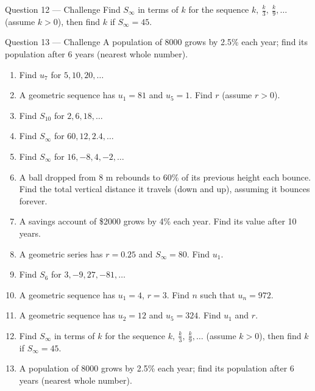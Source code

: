 \documentclass[11pt]{article}
\begin{document}
\begin{qbox}{Question 12 --- Challenge}
Find $S_\infty$ in terms of $k$ for the sequence $k,\ \tfrac k3,\ \tfrac{k}{9},\dots$ (assume $k>0$), then find $k$ if $S_\infty=45$.\workspace{3.4cm}
\end{qbox}

\begin{qbox}{Question 13 --- Challenge}
A population of 8000 grows by 2.5\% each year; find its population after 6 years (nearest whole number).\workspace{3.2cm}
\end{qbox}

\clearpage
{}

\begin{recapbox}
\begin{multicols}{2}
\small
\begin{enumerate}[leftmargin=*,itemsep=3pt]
  \item Find $u_7$ for $5,10,20,\dots$
  \item A geometric sequence has $u_1=81$ and $u_5=1$. Find $r$ (assume $r>0$).
  \item Find $S_{10}$ for $2,6,18,\dots$
  \item Find $S_\infty$ for $60,12,2.4,\dots$
  \item Find $S_\infty$ for $16,-8,4,-2,\dots$
  \item A ball dropped from 8 m rebounds to 60\% of its previous height each bounce. Find the total vertical distance it travels (down and up), assuming it bounces forever.
  \item A savings account of \$2000 grows by 4\% each year. Find its value after 10 years.
  \item A geometric series has $r=0.25$ and $S_\infty=80$. Find $u_1$.
  \item Find $S_6$ for $3,-9,27,-81,\dots$
  \item A geometric sequence has $u_1=4$, $r=3$. Find $n$ such that $u_n=972$.
  \item A geometric sequence has $u_2=12$ and $u_5=324$. Find $u_1$ and $r$.
  \item Find $S_\infty$ in terms of $k$ for the sequence $k,\ \tfrac k3,\ \tfrac{k}{9},\dots$ (assume $k>0$), then find $k$ if $S_\infty=45$.
  \item A population of 8000 grows by 2.5\% each year; find its population after 6 years (nearest whole number).
\end{enumerate}
\end{multicols}
\end{recapbox}
\end{document}
